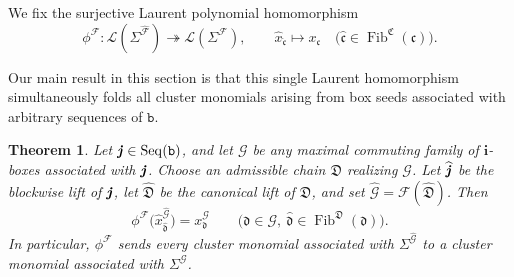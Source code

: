 \documentclass[12pt, leqno]{amsart}
\numberwithin{equation}{section}
\theoremstyle{plain}
\newtheorem{theorem}[lemma]{Theorem}
\theoremstyle{definition}
\newcommand{\jj}{ \textbf{\textit{j}}}
\newcommand{\Fib}{\operatorname{Fib}}
\newcommand{\hx}{\widehat{x}}
\newcommand{\hjj}{{\widehat{\jj}}}
\newcommand{\frakC}{\mathfrak{C}}
\newcommand{\frakD}{\mathfrak{D}}
\newcommand{\frakc}{\mathfrak{c}}
\newcommand{\frakd}{\mathfrak{d}}
\newcommand{\hfrakc}{\widehat{\frakc}}
\newcommand{\hfrakd}{\widehat{\frakd}}
\newcommand{\bfi}{\mathbf{i}}
\newcommand{\calF}{\mathcal{F}}
\newcommand{\calG}{\mathcal{G}}
\newcommand{\calL}{\mathcal{L}}
\newcommand{\hcalF}{{\widehat{\calF}}}
\newcommand{\hcalG}{{\widehat{\calG}}}
\newcommand{\ttb}{\mathtt{b}}
\newcommand{\Seq}{\mathrm{Seq}}
\begin{document}
We fix the surjective Laurent polynomial homomorphism
\[
\phi^\calF: \calL(\Sigma^\hcalF) \twoheadrightarrow \calL(\Sigma^\calF),
\qquad
\hx_{\hfrakc}\longmapsto x_\frakc \quad \bigl(\hfrakc\in\Fib^\frakC(\frakc)\bigr).
\]

Our main result in this section is that this single Laurent
homomorphism simultaneously folds all cluster monomials arising from
box seeds associated with arbitrary sequences of $\ttb$.

\begin{theorem}\label{thm: global cluster monomial folding}
Let $\jj\in\Seq(\ttb)$, and let $\calG$ be any maximal commuting
family of   $\bfi$-boxes associated with $\jj$. Choose an admissible chain $\frakD$ realizing
 $\calG$. Let $\hjj$ be the blockwise lift of $\jj$, let
$\widehat{\frakD}$ be the canonical lift of $\frakD$, and set
$\hcalG=\calF(\widehat{\frakD})$.{} Then
\[
\phi^\calF\bigl(\hx^\hcalG_{\hfrakd}\bigr) = x^\calG_{\frakd}
\qquad
\bigl( \frakd\in\calG,\  \hfrakd\in\Fib^\frakD(\frakd) \bigr).
\]
In particular, $\phi^\calF$ sends every cluster monomial associated
with $\Sigma^\hcalG$ to a cluster monomial associated with
$\Sigma^\calG$.
\end{theorem}
\end{document}
